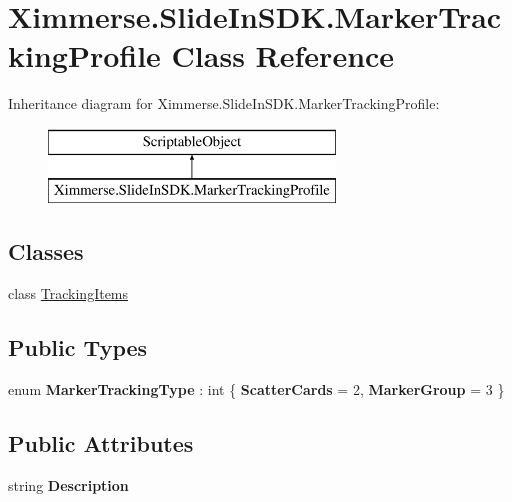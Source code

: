 \hypertarget{class_ximmerse_1_1_slide_in_s_d_k_1_1_marker_tracking_profile}{}\section{Ximmerse.\+Slide\+In\+S\+D\+K.\+Marker\+Tracking\+Profile Class Reference}
\label{class_ximmerse_1_1_slide_in_s_d_k_1_1_marker_tracking_profile}
Inheritance diagram for Ximmerse.\+Slide\+In\+S\+D\+K.\+Marker\+Tracking\+Profile\+:\begin{figure}[H]
\begin{center}
\leavevmode
\includegraphics[height=2.000000cm]{class_ximmerse_1_1_slide_in_s_d_k_1_1_marker_tracking_profile}
\end{center}
\end{figure}
\subsection*{Classes}
\begin{DoxyCompactItemize}
\item 
class \mbox{\hyperlink{class_ximmerse_1_1_slide_in_s_d_k_1_1_marker_tracking_profile_1_1_tracking_items}{Tracking\+Items}}
\end{DoxyCompactItemize}
\subsection*{Public Types}
\begin{DoxyCompactItemize}
\item 
\mbox{\label{class_ximmerse_1_1_slide_in_s_d_k_1_1_marker_tracking_profile_a027674ac2dc0d476a142a463e9d9cf8c}} 
enum {\bfseries Marker\+Tracking\+Type} \+: int \{ {\bfseries Scatter\+Cards} = 2, 
{\bfseries Marker\+Group} = 3
 \}
\end{DoxyCompactItemize}
\subsection*{Public Attributes}
\begin{DoxyCompactItemize}
\item 
\mbox{\label{class_ximmerse_1_1_slide_in_s_d_k_1_1_marker_tracking_profile_a79d2bd4635a294e2928c2531ce8eec96}} 
string {\bfseries Description}
\end{DoxyCompactItemize}
